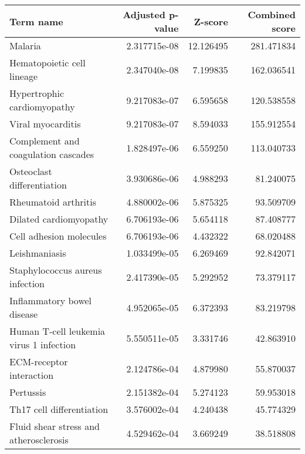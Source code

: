 \begin{tabular}{lrrr}
\toprule
                                         Term name &  Adjusted p-value &   Z-score &  Combined score \\
\midrule
                                           Malaria &      2.317715e-08 & 12.126495 &      281.471834 \\
                        Hematopoietic cell lineage &      2.347040e-08 &  7.199835 &      162.036541 \\
                       Hypertrophic cardiomyopathy &      9.217083e-07 &  6.595658 &      120.538558 \\
                                 Viral myocarditis &      9.217083e-07 &  8.594033 &      155.912554 \\
               Complement and coagulation cascades &      1.828497e-06 &  6.559250 &      113.040733 \\
                        Osteoclast differentiation &      3.930686e-06 &  4.988293 &       81.240075 \\
                              Rheumatoid arthritis &      4.880002e-06 &  5.875325 &       93.509709 \\
                            Dilated cardiomyopathy &      6.706193e-06 &  5.654118 &       87.408777 \\
                           Cell adhesion molecules &      6.706193e-06 &  4.432322 &       68.020488 \\
                                     Leishmaniasis &      1.033499e-05 &  6.269469 &       92.842071 \\
                   Staphylococcus aureus infection &      2.417390e-05 &  5.292952 &       73.379117 \\
                        Inflammatory bowel disease &      4.952065e-05 &  6.372393 &       83.219798 \\
           Human T-cell leukemia virus 1 infection &      5.550511e-05 &  3.331746 &       42.863910 \\
                          ECM-receptor interaction &      2.124786e-04 &  4.879980 &       55.870037 \\
                                         Pertussis &      2.151382e-04 &  5.274123 &       59.953018 \\
                         Th17 cell differentiation &      3.576002e-04 &  4.240438 &       45.774329 \\
            Fluid shear stress and atherosclerosis &      4.529462e-04 &  3.669249 &       38.518808 \\

\end{tabular}
